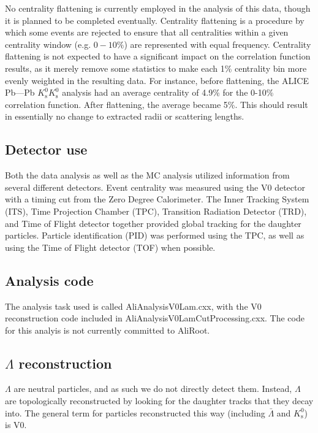 No centrality flattening is currently employed in the analysis of this data, though it is planned to be completed eventually.  
Centrality flattening is a procedure by which some events are rejected to ensure that all centralities within a given centrality window (e.g. $0-10\%$) are represented with equal frequency.  
Centrality flattening is not expected to have a significant impact on the correlation function results, as it merely remove some statistics to make each 1\% centrality bin more evenly weighted in the resulting data.  
For instance, before flattening, the ALICE Pb---Pb $K^0_\mathrm{s}K^0_\mathrm{s}$ analysis had an average centrality of 4.9\% for the 0-10\% correlation function.  
After flattening, the average became 5\%.  
This should result in essentially no change to extracted radii or scattering lengths.

\subsection{Detector use}
Both the data analysis as well as the MC analysis utilized information from several different detectors.  
Event centrality was measured using the V0 detector with a timing cut from the Zero Degree Calorimeter.  
The Inner Tracking System (ITS), Time Projection Chamber (TPC), Transition Radiation Detector (TRD), and Time of Flight detector together provided global tracking for the daughter particles.  
Particle identification (PID) was performed using the TPC, as well as using the Time of Flight detector (TOF) when possible.

\subsection{Analysis code}
The analysis task used is called AliAnalysisV0Lam.cxx, with the V0 reconstruction code included in AliAnalysisV0LamCutProcessing.cxx.  
The code for this analyis is not currently committed to AliRoot.

\subsection{\texorpdfstring{$\Lambda$}{Lambda} reconstruction}
\label{sec:Recon}

$\Lambda$ are neutral particles, and as such we do not directly detect them.  
Instead, $\Lambda$ are topologically reconstructed by looking for the daughter tracks that they decay into.  
The general term for particles reconstructed this way (including $\bar{\Lambda}$ and $K^0_\mathrm{s}$) is V0.

